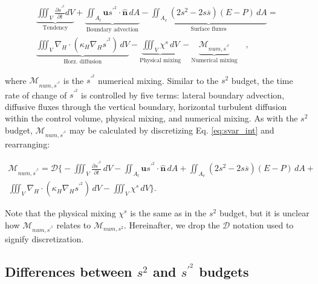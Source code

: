 \documentclass[draft]{agujournal2019}
\begin{document}
\begin{linenomath*}
\begin{equation} \label{eq:svar_int}
    \begin{split}
        \underbrace{\iiint_V \frac{\partial s^{\prime^2}}{\partial t} dV}_{\text{Tendency}} + \underbrace{\iint_{A_l} \mathbf{u}s^{\prime^2} \cdot \hat{\mathbf{n}} \, dA}_{\text{Boundary advection}}  - \underbrace{\iint_{A_{v}}(2s^2-2s \overline{s})(E-P) \, dA}_{\text{Surface fluxes}} = \\
        \underbrace{\iiint_{V} \nabla_H \cdot (\kappa_H \nabla_H s^{\prime^2}) \, dV}_{\text{Horz. diffusion}}-
        \underbrace{\iiint_V \chi^s  \, dV}_{\text{Physical mixing}} - \underbrace{\mathcal{M}_{num, s^{\prime^2}}}_\text{Numerical mixing} \quad ,
   \end{split}
\end{equation}
\end{linenomath*}
where $\mathcal{M}_{num, s^{\prime^2}}$ is the $s^{\prime^2}$ numerical mixing. Similar to the $s^2$ budget, the time rate of change of $s^{\prime^2}$ is controlled by five terms: lateral boundary advection, diffusive fluxes through the vertical boundary, horizontal turbulent diffusion within the control volume, physical mixing, and numerical mixing. As with the $s^2$ budget, $\mathcal{M}_{num, s^{\prime^2}}$ may be calculated by discretizing Eq. \ref{eq:svar_int} and rearranging:
\begin{linenomath*}
\begin{equation} \label{eq:sprime2_mnum}
    \begin{split}
        \mathcal{M}_{num, s^{\prime^2}} = \mathcal{D} \biggl\{-\iiint_V \frac{\partial s^{\prime^2}}{\partial t} \, dV - \iint_{A_l} \mathbf{u}s^{\prime^2} \cdot \hat{\mathbf{n}} \,  dA + \iint_{A_{v}}(2s^2-2s \overline{s})(E-P) \, dA + \\
        \iiint_{V} \nabla_H \cdot (\kappa_H \nabla_H s^{\prime^2}) \, dV - \iiint_V \chi^s \, dV\biggl\}.
   \end{split}
\end{equation}
\end{linenomath*}

Note that the physical mixing $\chi^s$ is the same as in the $s^2$ budget, but it is unclear how $\mathcal{M}_{num, s^{\prime^2}}$ relates to $\mathcal{M}_{num, s^2}$. Hereinafter, we drop the $\mathcal{D}{}$ notation used to signify discretization.

\subsection{Differences between $s^2$ and $s^{\prime^2}$ budgets}
\end{document}
